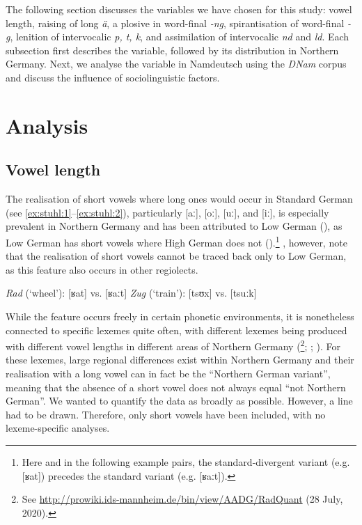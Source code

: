 \documentclass[output=paper]{langsci/langscibook}
\begin{document}
The following section discusses the variables we have chosen for this study: vowel length, raising of long \textit{ä}, a plosive in word-final \textit{-ng}, spirantisation of word-final \textit{-g}, lenition of intervocalic \textit{p, t, k}, and assimilation of intervocalic \textit{nd} and \textit{ld}. Each subsection first describes the variable, followed by its distribution in Northern Germany. Next, we analyse the variable in Namdeutsch using the \textit{DNam} corpus and discuss the influence of sociolinguistic factors.

\section{Analysis}
\label{sec:stuhl:4}
\subsection{Vowel length}
\label{sec:stuhl:4.1}

The realisation of short vowels where long ones would occur in Standard German (see \ref{ex:stuhl:1}--\ref{ex:stuhl:2}), particularly [aː], [oː], [uː], and [iː], is especially prevalent in Northern Germany and has been attributed to Low German (\citealt[135]{martens_niederdeutsch-bedingte_1988}), as Low German has short vowels where High German does not (\citealt[141]{elmentaler_norddeutscher_2015}).\footnote{Here and in the following example pairs, the standard-divergent variant (e.g. {[ʁat]}) precedes the standard variant (e.g. {[ʁaːt]}).} \citet[141]{elmentaler_norddeutscher_2015}, however, note that the realisation of short vowels cannot be traced back only to Low German, as this feature also occurs in other regiolects.

\ea\label{ex:stuhl:1}
\textit{Rad} (‘wheel’): {[ʁat]} vs. {[ʁaːt]} 
\ex\label{ex:stuhl:2}
\textit{Zug} (‘train’): {[tsʊx]} vs. {[tsuːk]} 
\z
 
 

While the feature occurs freely in certain phonetic environments, it is nonetheless connected to specific lexemes quite often, with different lexemes being produced with different vowel lengths in different areas of Northern Germany (\citealt{kleiner_atlas_2011}\footnote{See \url{http://prowiki.ids-mannheim.de/bin/view/AADG/RadQuant} (28 July, 2020).}; \citealt[144]{elmentaler_norddeutscher_2015}; \citealt[65]{kleiner_duden_2015}). For these lexemes, large regional differences exist within Northern Germany and their realisation with a long vowel can in fact be the “Northern German variant”, meaning that the absence of a short vowel does not always equal “not Northern German”. We wanted to quantify the data as broadly as possible. However, a line had to be drawn. Therefore, only short vowels have been included, with no lexeme-specific analyses.
\end{document}
